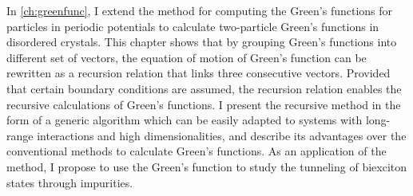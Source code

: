 In \autoref{ch:greenfunc}, I extend the method\cite{Berciu2010, Berciu2011, Berciu2012} for computing the Green's 
functions for particles in periodic potentials to calculate 
two-particle 
Green's functions in disordered crystals. 
This chapter shows that by grouping Green's functions into different set of vectors, the 
equation of motion of Green's function can be rewritten as a recursion relation that links three consecutive vectors. 
Provided that certain boundary conditions are assumed, the recursion relation enables the recursive calculations of Green's 
functions. I present the recursive method in the form of a generic algorithm which can be easily 
adapted to systems with long-range interactions and high dimensionalities, and describe its advantages over the conventional methods to calculate Green's functions. As an application of the method, I propose
to use the Green’s function to study the tunneling of biexciton states through
 impurities.


